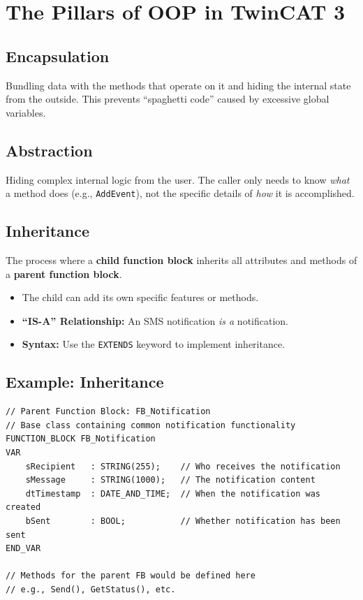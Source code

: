 \documentclass[11pt,a4paper]{article}
\begin{document}
\section{The Pillars of OOP in TwinCAT 3}

\subsection{Encapsulation}

Bundling data with the methods that operate on it and hiding the internal state from the outside. This prevents ``spaghetti code'' caused by excessive global variables.

\subsection{Abstraction}

Hiding complex internal logic from the user. The caller only needs to know \textit{what} a method does (e.g., \texttt{AddEvent}), not the specific details of \textit{how} it is accomplished.

\subsection{Inheritance}

The process where a \textbf{child function block} inherits all attributes and methods of a \textbf{parent function block}.

\begin{itemize}[leftmargin=*]
    \item The child can add its own specific features or methods.
    \item \textbf{``IS-A'' Relationship:} An SMS notification \textit{is a} notification.
    \item \textbf{Syntax:} Use the \texttt{EXTENDS} keyword to implement inheritance.
\end{itemize}

\subsection*{Example: Inheritance}

\begin{lstlisting}
// Parent Function Block: FB_Notification
// Base class containing common notification functionality
FUNCTION_BLOCK FB_Notification
VAR
    sRecipient   : STRING(255);    // Who receives the notification
    sMessage     : STRING(1000);   // The notification content
    dtTimestamp  : DATE_AND_TIME;  // When the notification was created
    bSent        : BOOL;           // Whether notification has been sent
END_VAR

// Methods for the parent FB would be defined here
// e.g., Send(), GetStatus(), etc.
\end{lstlisting}
\end{document}
